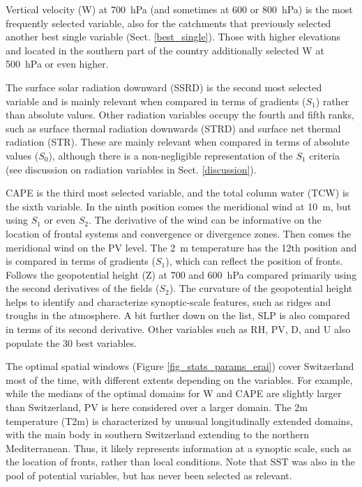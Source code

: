 \documentclass[draft]{agujournal2019}
\begin{document}
Vertical velocity (W) at 700~hPa (and sometimes at 600 or 800~hPa) is the most frequently selected variable, also for the catchments that previously selected another best single variable (Sect. \ref{best_single}). Those with higher elevations and located in the southern part of the country additionally selected W at 500~hPa or even higher.

The surface solar radiation downward (SSRD) is the second most selected variable and is mainly relevant when compared in terms of gradients ($S_{1}$) rather than absolute values. Other radiation variables occupy the fourth and fifth ranks, such as surface thermal radiation downwards (STRD) and surface net thermal radiation (STR). These are mainly relevant when compared in terms of absolute values ($S_{0}$), although there is a non-negligible representation of the $S_{1}$ criteria (see discussion on radiation variables in Sect. \ref{discussion}).

CAPE is the third most selected variable, and the total column water (TCW) is the sixth variable. In the ninth position comes the meridional wind at 10~m, but using $S_{1}$ or even $S_{2}$. The derivative of the wind can be informative on the location of frontal systems and convergence or divergence zones. Then comes the meridional wind on the PV level. The 2~m temperature has the 12th position and is compared in terms of gradients ($S_{1}$), which can reflect the position of fronts. Follows the geopotential height (Z) at 700 and 600~hPa compared primarily using the second derivatives of the fields ($S_{2}$). The curvature of the geopotential height helps to identify and characterize synoptic-scale features, such as ridges and troughs in the atmosphere. A bit further down on the list, SLP is also compared in terms of its second derivative. Other variables such as RH, PV, D, and U also populate the 30 best variables.

The optimal spatial windows (Figure \ref{fig_stats_params_erai}) cover Switzerland most of the time, with different extents depending on the variables. For example, while the medians of the optimal domains for W and CAPE are slightly larger than Switzerland, PV is here considered over a larger domain. The 2m temperature (T2m) is characterized by unusual longitudinally extended domains, with the main body in southern Switzerland extending to the northern Mediterranean. Thus, it likely represents information at a synoptic scale, such as the location of fronts, rather than local conditions. Note that SST was also in the pool of potential variables, but has never been selected as relevant.
\end{document}
